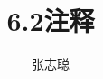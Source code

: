 \documentclass{article}
\begin{document}
\title{6.2注释}
\author{张志聪}
\maketitle









\end{document}
